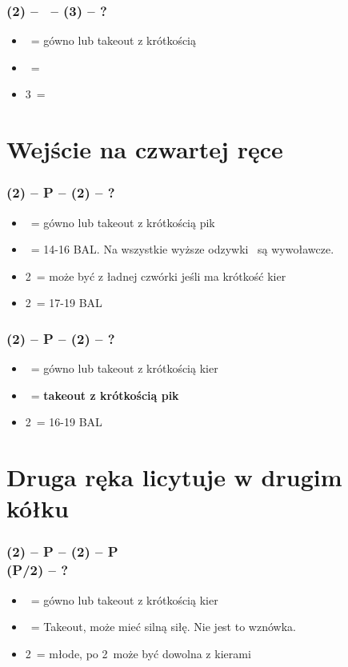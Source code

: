 \documentclass[12pt, a4paper]{article}
\begin{document}
\subsubsection*{(2\diams) -- \dbl\ -- (3\hearts) -- ?}
\begin{itemize}
    \item \pass\ = gówno lub takeout z krótkością \spades
    \item \dbl\ = \gf\
    \item 3\spades\ = \gf
\end{itemize}



\pagebreak
\section{Wejście na czwartej ręce}

\subsubsection*{(2\diams) -- P -- (2\hearts) -- ?}
\begin{itemize}
    \item \pass\ = gówno lub takeout z krótkością pik
    \item \dbl\ = 14-16 BAL. Na wszystkie wyższe odzywki \dbl\ są wywoławcze.
    \item 2\spades\ = może być z ładnej czwórki jeśli ma krótkość kier
    \item 2\nt\ = 17-19 BAL
\end{itemize}


\subsubsection*{(2\diams) -- P -- (2\spades) -- ?}
\begin{itemize}
    \item \pass\ = gówno lub takeout z krótkością kier
    \item \dbl\ = \textbf{takeout z krótkością pik} \imp
    \item 2\nt\ = 16-19 BAL \imp
\end{itemize}


\section*{Druga ręka licytuje w drugim kółku}
\subsubsection*{(2\diams) -- P -- (2\hearts) -- P \\ (P/2\spades) -- ?}
\begin{itemize}
    \item \pass\ = gówno lub takeout z krótkością kier
    \item \dbl\ = Takeout, może mieć silną siłę. Nie jest to wznówka.
    \item 2\nt\ = młode, po 2\spades\ może być dowolna z kierami
\end{itemize}
\end{document}
